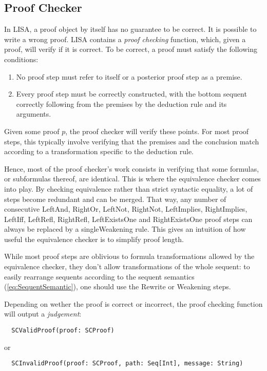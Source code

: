 \subsection{Proof Checker}
\label{subsec:proofchecker}

In LISA, a proof object by itself has no guarantee to be correct. It is possible to write a wrong proof. LISA contains a \textit{proof checking} function, which, given a proof, will verify if it is correct. To be correct, a proof must satisfy the following conditions:
\begin{enumerate}
  \item No proof step must refer to itself or a posterior proof step as a premise.
  \item Every proof step must be correctly constructed, with the bottom sequent correctly following from the premises by the deduction rule and its arguments.
\end{enumerate}


Given some proof $p$, the proof checker will verify these points. For most proof steps, this typically involve verifying that the premises and the conclusion match according to a transformation specific to the deduction rule. 

Hence, most of the proof checker's work consists in verifying that some formulas, or subformulas thereof, are identical. This is where the equivalence checker comes into play. By checking equivalence rather than strict syntactic equality, a lot of steps become redundant and can be merged. That way,  any number of consecutive {LeftAnd}, {RightOr}, {LeftNot}, {RightNot}, {LeftImplies}, {RightImplies}, {LeftIff}, {LeftRefl}, {RightRefl}, {LeftExistsOne} and  {RightExistsOne} proof steps can always be replaced by a single{Weakening} rule. This gives an intuition of how useful the equivalence checker is to simplify proof length.

While most proof steps are oblivious to formula transformations allowed by the equivalence checker, they don't allow transformations of the whole sequent: to easily rearrange sequents according to the sequent semantics (\ref{eq:SequentSemantic}), one should use the Rewrite or Weakening steps.

Depending on wether the proof is correct or incorrect, the proof checking function will output a \textit{judgement}:
\begin{lstlisting}
  SCValidProof(proof: SCProof)
\end{lstlisting}
or
\begin{lstlisting}
  SCInvalidProof(proof: SCProof, path: Seq[Int], message: String)
\end{lstlisting}

